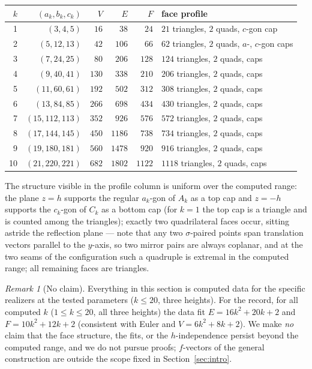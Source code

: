 \documentclass[11pt]{article}
\theoremstyle{definition}
\theoremstyle{remark}
\newtheorem{remark}[theorem]{Remark}
\begin{document}
\begin{center}
\begin{tabular}{rrrrrl}
\toprule
$k$ & $(a_k,b_k,c_k)$ & $V$ & $E$ & $F$ & face profile \\
\midrule
 1 & $(3,4,5)$        & $16$  & $38$   & $24$   & $21$ triangles, $2$ quads, $c$-gon cap \\
 2 & $(5,12,13)$      & $42$  & $106$  & $66$   & $62$ triangles, $2$ quads, $a$-, $c$-gon caps \\
 3 & $(7,24,25)$      & $80$  & $206$  & $128$  & $124$ triangles, $2$ quads, caps \\
 4 & $(9,40,41)$      & $130$ & $338$  & $210$  & $206$ triangles, $2$ quads, caps \\
 5 & $(11,60,61)$     & $192$ & $502$  & $312$  & $308$ triangles, $2$ quads, caps \\
 6 & $(13,84,85)$     & $266$ & $698$  & $434$  & $430$ triangles, $2$ quads, caps \\
 7 & $(15,112,113)$   & $352$ & $926$  & $576$  & $572$ triangles, $2$ quads, caps \\
 8 & $(17,144,145)$   & $450$ & $1186$ & $738$  & $734$ triangles, $2$ quads, caps \\
 9 & $(19,180,181)$   & $560$ & $1478$ & $920$  & $916$ triangles, $2$ quads, caps \\
10 & $(21,220,221)$   & $682$ & $1802$ & $1122$ & $1118$ triangles, $2$ quads, caps \\
\bottomrule
\end{tabular}
\end{center}

The structure visible in the profile column is uniform over the computed
range: the plane $z=h$ supports the regular $a_k$-gon of $A_k$ as a top
cap and $z=-h$ supports the $c_k$-gon of $C_k$ as a bottom cap (for
$k=1$ the top cap is a triangle and is counted among the triangles);
exactly two quadrilateral faces occur, sitting astride the reflection
plane --- note that any two $\sigma$-paired points span translation
vectors parallel to the $y$-axis, so two mirror pairs are always
coplanar, and at the two seams of the configuration such a quadruple is
extremal in the computed range; all remaining faces are triangles.

\begin{remark}[No claim]\label{rem:noclaim}
Everything in this section is computed data for the specific realizers at
the tested parameters ($k\le 20$, three heights). For the record, for all
computed $k$ ($1\le k\le 20$, all three heights) the data fit
$E=16k^2+20k+2$ and $F=10k^2+12k+2$ (consistent with Euler and
$V=6k^2+8k+2$). We make
\emph{no} claim that the face structure, the fits, or the
$h$-independence persist beyond the computed range, and we do not pursue
proofs; $f$-vectors of the general construction are outside the scope
fixed in Section~\ref{sec:intro}.
\end{remark}
\end{document}
